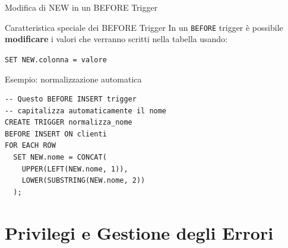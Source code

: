 \documentclass[aspectratio=169]{beamer}
\begin{document}
\begin{frame}[fragile]{Modifica di NEW in un BEFORE Trigger}
  \begin{block}{Caratteristica speciale dei BEFORE Trigger}
    In un \texttt{BEFORE} trigger è possibile \textbf{modificare} i valori
    che verranno scritti nella tabella usando:
    \vspace{0.2cm}
    \begin{center}
      \texttt{SET NEW.colonna = valore}
    \end{center}
  \end{block}
  \vspace{0.3cm}
  \begin{exampleblock}{Esempio: normalizzazione automatica}
    \begin{lstlisting}[style=sqlstyle]
-- Questo BEFORE INSERT trigger
-- capitalizza automaticamente il nome
CREATE TRIGGER normalizza_nome
BEFORE INSERT ON clienti
FOR EACH ROW
  SET NEW.nome = CONCAT(
    UPPER(LEFT(NEW.nome, 1)),
    LOWER(SUBSTRING(NEW.nome, 2))
  );
    \end{lstlisting}
  \end{exampleblock}
\end{frame}

\section{Privilegi e Gestione degli Errori}
\end{document}
